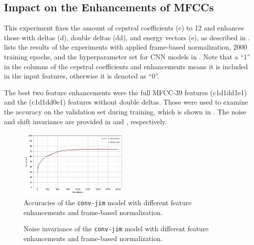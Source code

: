 \subsection{Impact on the Enhancements of MFCCs}\label{sec:exp_fs_mfcc}
This experiment fixes the amount of cepstral coefficients (c) to 12 and enhances those with deltas (d), double deltas (dd), and energy vectors (e), as described in .
 lists the results of the experiments with applied frame-based normalization, 2000 training epochs, and the hyperparameter set for CNN models in .
Note that a \enquote{1} in the columns of the cepstral coefficients and enhancements means it is included in the input features, otherwise it is denoted as \enquote{0}.

The best two feature enhancements were the full MFCC-39 features (c1d1dd1e1) and the (c1d1dd0e1) features without double deltas.
Those were used to examine the accuracy on the validation set during training, which is shown in .
The noise and shift invariance are provided in  and , respectively.
\begin{figure}[!ht]
  \centering
  \includegraphics[width=0.48\textwidth]{./5_exp/figs/exp_fs_mfcc_acc_conv-jim.png}
  \caption{Accuracies of the \texttt{conv-jim} model with different feature enhancements and frame-based normalization.}
  \label{fig:exp_fs_mfcc_tb_acc_conv-jim}
\end{figure}
\FloatBarrier
\noindent
\begin{figure}[!ht]
  \centering
  \qquad
  \caption{Noise invariance of the \texttt{conv-jim} model with different feature enhancements and frame-based normalization.}
  \label{fig:exp_fs_mfcc_tb_noise_conv-jim}
\end{figure}
